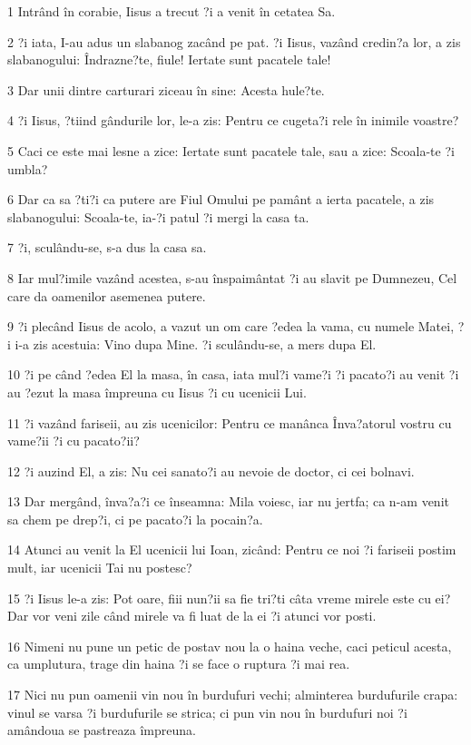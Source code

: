 \par 1 Intrând în corabie, Iisus a trecut ?i a venit în cetatea Sa.
\par 2 ?i iata, I-au adus un slabanog zacând pe pat. ?i Iisus, vazând credin?a lor, a zis slabanogului: Îndrazne?te, fiule! Iertate sunt pacatele tale!
\par 3 Dar unii dintre carturari ziceau în sine: Acesta hule?te.
\par 4 ?i Iisus, ?tiind gândurile lor, le-a zis: Pentru ce cugeta?i rele în inimile voastre?
\par 5 Caci ce este mai lesne a zice: Iertate sunt pacatele tale, sau a zice: Scoala-te ?i umbla?
\par 6 Dar ca sa ?ti?i ca putere are Fiul Omului pe pamânt a ierta pacatele, a zis slabanogului: Scoala-te, ia-?i patul ?i mergi la casa ta.
\par 7 ?i, sculându-se, s-a dus la casa sa.
\par 8 Iar mul?imile vazând acestea, s-au înspaimântat ?i au slavit pe Dumnezeu, Cel care da oamenilor asemenea putere.
\par 9 ?i plecând Iisus de acolo, a vazut un om care ?edea la vama, cu numele Matei, ?i i-a zis acestuia: Vino dupa Mine. ?i sculându-se, a mers dupa El.
\par 10 ?i pe când ?edea El la masa, în casa, iata mul?i vame?i ?i pacato?i au venit ?i au ?ezut la masa împreuna cu Iisus ?i cu ucenicii Lui.
\par 11 ?i vazând fariseii, au zis ucenicilor: Pentru ce manânca Înva?atorul vostru cu vame?ii ?i cu pacato?ii?
\par 12 ?i auzind El, a zis: Nu cei sanato?i au nevoie de doctor, ci cei bolnavi.
\par 13 Dar mergând, înva?a?i ce înseamna: Mila voiesc, iar nu jertfa; ca n-am venit sa chem pe drep?i, ci pe pacato?i la pocain?a.
\par 14 Atunci au venit la El ucenicii lui Ioan, zicând: Pentru ce noi ?i fariseii postim mult, iar ucenicii Tai nu postesc?
\par 15 ?i Iisus le-a zis: Pot oare, fiii nun?ii sa fie tri?ti câta vreme mirele este cu ei? Dar vor veni zile când mirele va fi luat de la ei ?i atunci vor posti.
\par 16 Nimeni nu pune un petic de postav nou la o haina veche, caci peticul acesta, ca umplutura, trage din haina ?i se face o ruptura ?i mai rea.
\par 17 Nici nu pun oamenii vin nou în burdufuri vechi; alminterea burdufurile crapa: vinul se varsa ?i burdufurile se strica; ci pun vin nou în burdufuri noi ?i amândoua se pastreaza împreuna.
